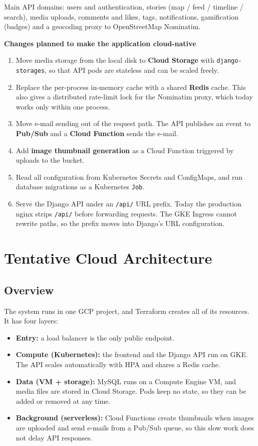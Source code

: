 \documentclass[11pt,a4paper]{article}
\newcommand{\code}[1]{\texttt{#1}}
\begin{document}
Main API domains: users and authentication, stories (map / feed / timeline /
search), media uploads, comments and likes, tags, notifications, gamification
(badges) and a geocoding proxy to OpenStreetMap Nominatim.

\textbf{Changes planned to make the application cloud-native}
\begin{enumerate}
  \item Move media storage from the local disk to \textbf{Cloud Storage} with
        \code{django-storages}, so that API pods are stateless and can be
        scaled freely.
  \item Replace the per-process in-memory cache with a shared \textbf{Redis}
        cache. This also gives a distributed rate-limit lock for the Nominatim
        proxy, which today works only within one process.
  \item Move e-mail sending out of the request path. The API publishes an event
        to \textbf{Pub/Sub} and a \textbf{Cloud Function} sends the e-mail.
  \item Add \textbf{image thumbnail generation} as a Cloud Function triggered
        by uploads to the bucket.
  \item Read all configuration from Kubernetes Secrets and ConfigMaps, and run
        database migrations as a Kubernetes \code{Job}.
  \item Serve the Django API under an \code{/api/} URL prefix. Today the
        production nginx strips \code{/api/} before forwarding requests. The
        GKE Ingress cannot rewrite paths, so the prefix moves into Django's URL
        configuration.
\end{enumerate}


\section{Tentative Cloud Architecture}

\subsection{Overview}

The system runs in one GCP project, and Terraform creates all of its
resources. It has four layers:

\begin{itemize}
  \item \textbf{Entry:} a load balancer is the only public endpoint.
  \item \textbf{Compute (Kubernetes):} the frontend and the Django API run on
        GKE. The API scales automatically with HPA and shares a Redis cache.
  \item \textbf{Data (VM + storage):} MySQL runs on a Compute Engine VM, and
        media files are stored in Cloud Storage. Pods keep no state, so they
        can be added or removed at any time.
  \item \textbf{Background (serverless):} Cloud Functions create thumbnails
        when images are uploaded and send e-mails from a Pub/Sub queue, so this
        slow work does not delay API responses.
\end{itemize}
\end{document}
